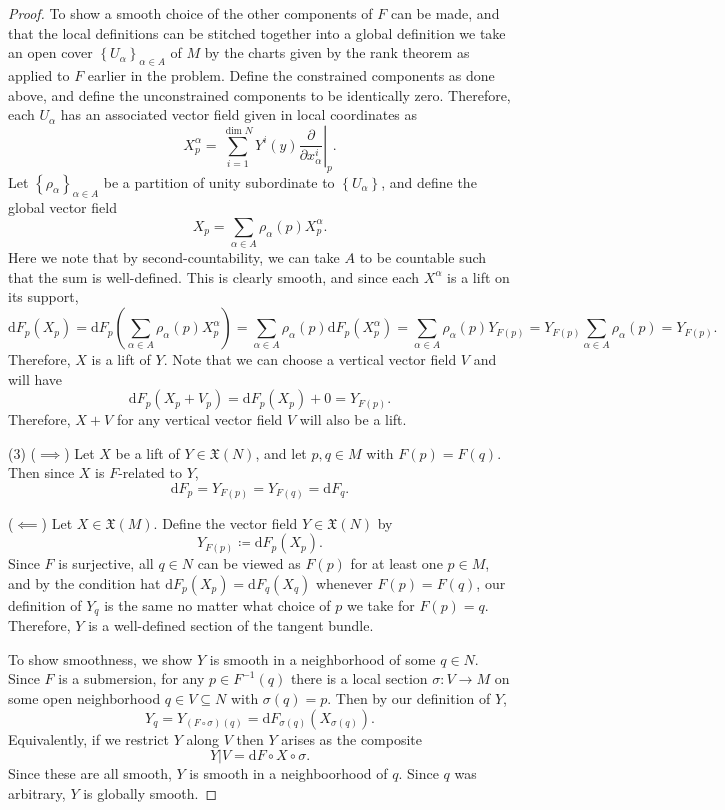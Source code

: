 \documentclass[11pt, letterpaper]{article}
\begin{document}
\begin{proof}
To show a smooth choice of the other components of $F$ can be made, and that the local definitions can be stitched together into a global definition we take an open cover $\left\{ U_\alpha  \right\}_{\alpha \in A} $ of $M$ by the charts given by the rank theorem as applied to $F$ earlier in the problem. Define the constrained components as done above, and define the unconstrained components to be identically zero. Therefore, each $U_\alpha $ has an associated vector field given in local coordinates as
\[
	X^\alpha _p =\left.\sum_{i=1}^{\dim N} Y^i(y) \frac{\partial }{\partial x^i_\alpha } \right|_p
.\]
Let $\left\{ \rho _\alpha  \right\}_{\alpha \in A} $ be a partition of unity subordinate to $\left\{ U_\alpha  \right\} $, and define the global vector field
\[
	X_p = \sum_{\alpha \in A} \rho _\alpha (p)X^\alpha _p
.\]
Here we note that by second-countability, we can take $A$ to be countable such that the sum is well-defined. This is clearly smooth, and since each $X^\alpha $ is a lift on its support,
\[
	\mathrm{d} F_p(X_p)=\mathrm{d} F_p\left( \sum_{\alpha \in A} \rho _\alpha (p)X^\alpha _p \right) = \sum_{\alpha \in A} \rho _\alpha (p)\mathrm{d} F_p(X^\alpha _p)=\sum_{\alpha \in A} \rho _\alpha (p)Y_{F(p)} =Y_{F(p)} \sum_{\alpha \in A} \rho _\alpha (p)=Y_{F(p)} 
.\]
Therefore, $X$ is a lift of $Y$. Note that we can choose a vertical vector field $V$ and will have
\[
	\mathrm{d} F_p(X_p+V_p)=\mathrm{d} F_p(X_p)+0=Y_{F(p)} 
.\]
Therefore, $X+V$ for any vertical vector field $V$ will also be a lift.



(3) ($\implies $) Let $X$ be a lift of $Y\in \mathfrak{X} (N)$, and let $p,q\in M$ with $F(p)=F(q)$. Then since $X$ is $F$-related to $Y$,
\[
	\mathrm{d} F_p = Y_{F(p)} =Y_{F(q)} =\mathrm{d} F_q
.\]

($\impliedby $) Let $X\in \mathfrak{X} (M)$. Define the vector field $Y\in \mathfrak{X} (N)$ by
\[
	Y_{F(p)} \coloneqq \mathrm{d} F_p(X_p)
.\]
Since $F$ is surjective, all $q\in N$ can be viewed as $F(p)$ for at least one $p\in M$, and by the condition hat $\mathrm{d} F_p(X_p)=\mathrm{d} F_q(X_q)$ whenever $F(p)=F(q)$, our definition of $Y_{q} $ is the same no matter what choice of $p$ we take for $F(p)=q$. Therefore, $Y$ is a well-defined section of the tangent bundle.

To show smoothness, we show $Y$ is smooth in a neighborhood of some $q\in N$. Since $F$ is a submersion, for any $p\in F^{-1} (q)$ there is a local section $\sigma : V \to M$ on some open neighborhood $q\in V \subseteq N$ with $\sigma (q)=p$. Then by our definition of $Y$,
\[
	Y_q=Y_{(F\circ \sigma )(q)} =\mathrm{d} F_{\sigma (q)} (X_{\sigma (q)} )
.\]
Equivalently, if we restrict $Y$ along $V$ then $Y$ arises as the composite
\[
	Y|V=\mathrm{d} F \circ X \circ \sigma 
.\]
Since these are all smooth, $Y$ is smooth in a neighboorhood of $q$. Since $q$ was arbitrary, $Y$ is globally smooth.


\end{proof}
\end{document}
